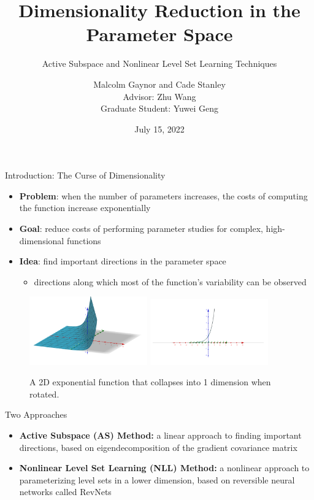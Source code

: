 \documentclass[10pt]{beamer}
\title[Dimensionality Reduction in the Parameter Space]{Dimensionality Reduction in the Parameter Space}
\subtitle{Active Subspace and Nonlinear Level Set Learning Techniques}
\author[Malcolm Gaynor and Cade Stanley]{Malcolm Gaynor and Cade Stanley \\{\scriptsize Advisor: Zhu Wang} \\{\scriptsize Graduate Student: Yuwei Geng}}
\institute[]{U of SC Summer REU: Summer School on Mathematical Foundation of Data Science}
\date[July 15, 2022]{July 15, 2022}
\begin{document}
\frame{\titlepage}

\begin{frame}{Introduction: The Curse of Dimensionality}
\begin{itemize}
    \item \textbf{Problem}: when the number of parameters increases, the costs of computing the function increase exponentially 
    
    \item \textbf{Goal}: reduce costs of performing parameter studies for complex, high-dimensional functions
    
    \item \textbf{Idea}: find important directions in the parameter space
    \begin{itemize}
        \item directions along which most of the function's variability can be observed
    \end{itemize}
\end{itemize}

\begin{figure}[H]
\includegraphics[width=2in]{images/exp example (3d).png}
\includegraphics[width=2in]{images/exp example (2d).png}
\caption{A 2D exponential function that collapses into 1 dimension when rotated.}
\end{figure}
\end{frame}

\begin{frame}{Two Approaches}
\begin{itemize}\itemsep20pt
    \item \textbf{Active Subspace (AS) Method:} a linear approach to finding important directions, based on eigendecomposition of the gradient covariance matrix
    \item \textbf{Nonlinear Level Set Learning (NLL) Method:} a nonlinear approach to parameterizing level sets in a lower dimension, based on reversible neural networks called RevNets 
\end{itemize}
\end{frame}
\end{document}
